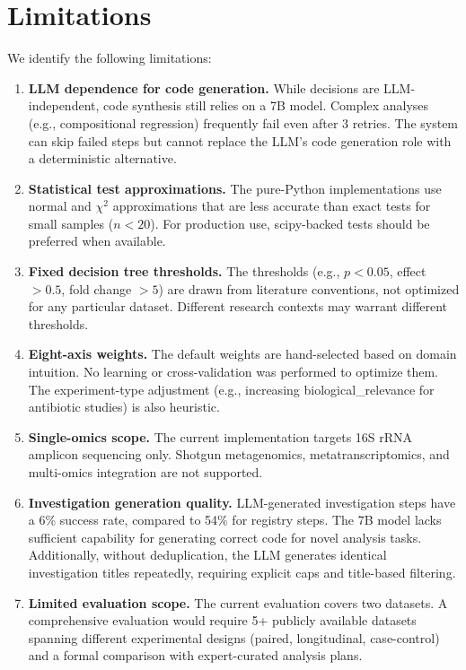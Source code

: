 \documentclass[11pt,a4paper]{article}
\begin{document}
\section{Limitations}
\label{sec:limits}

We identify the following limitations:

\begin{enumerate}
  \item \textbf{LLM dependence for code generation.}
    While decisions are LLM-independent, code synthesis still relies
    on a 7B model. Complex analyses (e.g., compositional regression)
    frequently fail even after 3 retries.
    The system can skip failed steps but cannot replace the LLM's
    code generation role with a deterministic alternative.

  \item \textbf{Statistical test approximations.}
    The pure-Python implementations use normal and $\chi^2$ approximations
    that are less accurate than exact tests for small samples ($n < 20$).
    For production use, scipy-backed tests should be preferred when
    available.

  \item \textbf{Fixed decision tree thresholds.}
    The thresholds (e.g., $p < 0.05$, effect $> 0.5$, fold change $> 5$)
    are drawn from literature conventions, not optimized for any
    particular dataset.
    Different research contexts may warrant different thresholds.

  \item \textbf{Eight-axis weights.}
    The default weights are hand-selected based on domain intuition.
    No learning or cross-validation was performed to optimize them.
    The experiment-type adjustment (e.g., increasing biological\_relevance
    for antibiotic studies) is also heuristic.

  \item \textbf{Single-omics scope.}
    The current implementation targets 16S rRNA amplicon sequencing only.
    Shotgun metagenomics, metatranscriptomics, and multi-omics
    integration are not supported.

  \item \textbf{Investigation generation quality.}
    LLM-generated investigation steps have a 6\% success rate,
    compared to 54\% for registry steps.
    The 7B model lacks sufficient capability for generating correct
    code for novel analysis tasks.
    Additionally, without deduplication, the LLM generates
    identical investigation titles repeatedly, requiring explicit
    caps and title-based filtering.

  \item \textbf{Limited evaluation scope.}
    The current evaluation covers two datasets.
    A comprehensive evaluation would require 5+ publicly available
    datasets spanning different experimental designs (paired,
    longitudinal, case-control) and a formal comparison with
    expert-curated analysis plans.
\end{enumerate}
\end{document}
